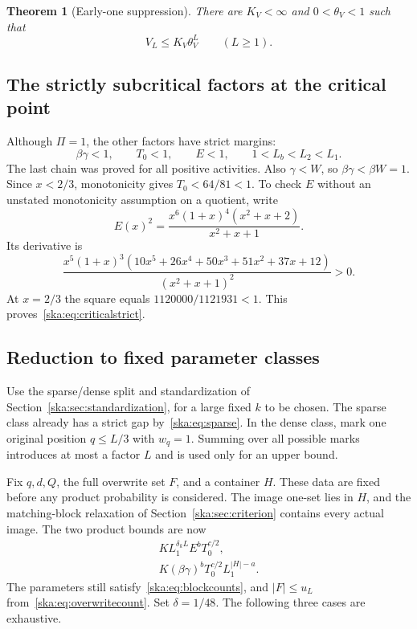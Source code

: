 \documentclass[11pt,letterpaper]{article}
\newtheorem{theorem}{Theorem}[section]
\theoremstyle{definition}
\begin{document}
\begin{theorem}[Early-one suppression]\label{ska:thm:early}
There are $K_V<\infty$ and $0<\theta_V<1$ such that
\begin{equation}\label{ska:eq:earlygap}
V_L\le K_V\theta_V^L\qquad(L\ge1).
\end{equation}
\end{theorem}

\subsection{The strictly subcritical factors at the critical point}
Although $\Pi=1$, the other factors have strict margins:
\begin{equation}\label{ska:eq:criticalstrict}
\beta\gamma<1,\qquad T_0<1,\qquad E<1,
\qquad 1<L_b<L_2<L_1.
\end{equation}
The last chain was proved for all positive activities. Also $\gamma<W$, so $\beta\gamma<\beta W=1$. Since $x<2/3$, monotonicity gives $T_0<64/81<1$. To check $E$ without an unstated monotonicity assumption on a quotient, write
\[
E(x)^2=\frac{x^6(1+x)^4(x^2+x+2)}{x^2+x+1}.
\]
Its derivative is
\begin{equation}\label{ska:eq:Ederivative}
\frac{x^5(1+x)^3
(10x^5+26x^4+50x^3+51x^2+37x+12)}{(x^2+x+1)^2}>0.
\end{equation}
At $x=2/3$ the square equals $1120000/1121931<1$. This proves~\eqref{ska:eq:criticalstrict}.

\subsection{Reduction to fixed parameter classes}
Use the sparse/dense split and standardization of Section~\ref{ska:sec:standardization}, for a large fixed $k$ to be chosen. The sparse class already has a strict gap by~\eqref{ska:eq:sparse}. In the dense class, mark one original position $q\le L/3$ with $w_q=1$. Summing over all possible marks introduces at most a factor $L$ and is used only for an upper bound.

Fix $q,d,Q$, the full overwrite set $F$, and a container $H$. These data are fixed before any product probability is considered. The image one-set lies in $H$, and the matching-block relaxation of Section~\ref{ska:sec:criterion} contains every actual image. The two product bounds are now
\begin{align}
K L_1^{\delta_kL} E^b T_0^{c/2},\label{ska:eq:criticalsharp}\\
K(\beta\gamma)^bT_0^{c/2}L_1^{|H|-a}.\label{ska:eq:criticalcrude}
\end{align}
The parameters still satisfy~\eqref{ska:eq:blockcounts}, and $|F|\le u_L$ from~\eqref{ska:eq:overwritecount}. Set $\delta=1/48$. The following three cases are exhaustive.
\end{document}
